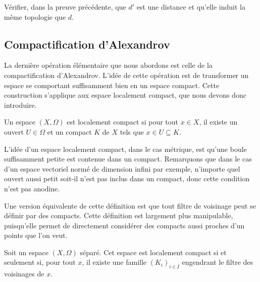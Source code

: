 \begin{exercise}\label{exo.desc.verif1}
  Vérifier, dans la preuve précédente, que $d'$ est une distance et qu'elle
  induit la même topologie que $d$.
\end{exercise}

\subsection{Compactification d'Alexandrov}

La dernière opération élémentaire que nous abordons est celle de la
compactification d'Alexandrov. L'idée de cette opération est de transformer un
espace se comportant suffisamment bien en un espace compact. Cette construction
s'applique aux espace localement compact, que nous devons donc introduire.

\begin{definition}
  Un espace $(X,\Omega)$ est localement compact si pour tout $x\in X$, il existe
  un ouvert $U\in \Omega$ et un compact $K$ de $X$ tels que $x\in U\subseteq K$.
\end{definition}

L'idée d'un espace localement compact, dans le cas métrique, est qu'une boule
suffisamment petite est contenue dans un compact. Remarquons que dans le cas
d'un espace vectoriel normé de dimension infini par exemple, n'importe quel
ouvert aussi petit soit-il n'est pas inclus dans un compact, donc cette
condition n'est pas anodine.

Une version équivalente de cette définition est que tout filtre de voisinage
peut se définir par des compacts. Cette définition est largement plus
manipulable, puisqu'elle permet de directement considérer des compacts aussi
proches d'un points que l'on veut.

\begin{proposition}\label{prop.carac.compac.loc}
  Soit un espace $(X,\Omega)$ séparé. Cet espace est localement compact si et
  seulement si, pour tout $x$, il existe une famille $(K_i)_{i \in I}$ engendrant
  le filtre des voisinages de $x$.
\end{proposition}

